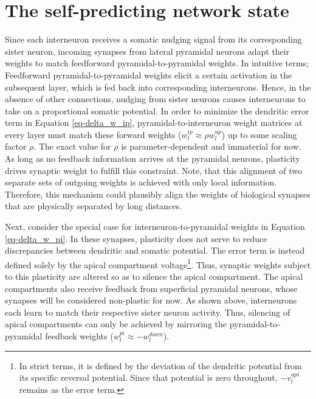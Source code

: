 \section{The self-predicting network state}\label{sec-selfpred}

Since each interneuron receives a somatic nudging signal from its corresponding sister neuron, incoming synapses from
lateral pyramidal neurons adapt their weights to match feedforward pyramidal-to-pyramidal weights. In intuitive terms;
Feedforward pyramidal-to-pyramidal weights elicit a certain activation in the subsequent layer, which is fed back into
corresponding interneurons. Hence, in the absence of other connections, nudging from sister neurons causes interneurons
to take on a proportional somatic potential. In order to minimize the dendritic error term in Equation
\ref{eq-delta_w_ip}, pyramidal-to-interneuron weight matrices at every layer must match these forward weights ($w_l^{ip}
\approx \rho w_l^{up}$) up to some scaling factor $\rho$. The exact value for $\rho$ is parameter-dependent and
immaterial for now. As long as no feedback information arrives at the pyramidal neurons, plasticity drives synaptic
weight to fulfill this constraint. Note, that this alignment of two separate sets of outgoing weights is achieved with
only local information. Therefore, this mechanism could plausibly align the weights of biological synapses that are
physically separated by long distances. \newline

Next, consider the special case for interneuron-to-pyramidal weights in Equation \ref{eq-delta_w_pi}. In these synapses,
plasticity does not serve to reduce discrepancies between dendritic and somatic potential. The error term is instead
defined solely by the apical compartment voltage\footnote{In strict terms, it is defined by the deviation of the
dendritic potential from its specific reversal potential. Since that potential is zero throughout, $- v_l^{api}$ remains
as the error term.}. Thus, synaptic weights subject to this plasticity are altered so as to silence the apical
compartment. The apical compartments also receive feedback from superficial pyramidal neurons, whose synapses will be
considered non-plastic for now. As shown above, interneurons each learn to match their respective sister neuron
activity. Thus, silencing of apical compartments can only be achieved by mirroring the pyramidal-to-pyramidal feedback
weights ($w_l^{pi} \approx -w_l^{down}$).\newline

